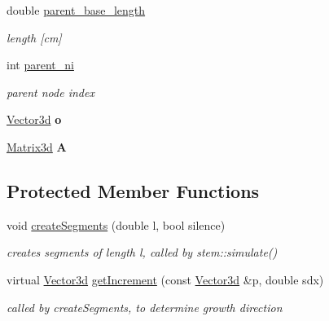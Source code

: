 \begin{DoxyCompactItemize}
\mbox{\label{classCPlantBox_1_1Leaf_a29ab9f0f1d359979004b9c3157061971}} 
double \hyperlink{classCPlantBox_1_1Leaf_a29ab9f0f1d359979004b9c3157061971}{parent\+\_\+base\+\_\+length}
\begin{DoxyCompactList}\small\item\em length \mbox{[}cm\mbox{]} \end{DoxyCompactList}\item 
\mbox{\label{classCPlantBox_1_1Leaf_af8f3ec361de47481109ce9df93cda3ec}} 
int \hyperlink{classCPlantBox_1_1Leaf_af8f3ec361de47481109ce9df93cda3ec}{parent\+\_\+ni}
\begin{DoxyCompactList}\small\item\em parent node index \end{DoxyCompactList}\item 
\mbox{\label{classCPlantBox_1_1Leaf_abc6c84cb5ba202076261bcf1a308c7aa}} 
\hyperlink{classCPlantBox_1_1Vector3d}{Vector3d} {\bfseries o}
\item 
\mbox{\label{classCPlantBox_1_1Leaf_a98beba3528f76279c56152b171146a9b}} 
\hyperlink{classCPlantBox_1_1Matrix3d}{Matrix3d} {\bfseries A}
\end{DoxyCompactItemize}
\subsection*{Protected Member Functions}
\begin{DoxyCompactItemize}
\item 
void \hyperlink{classCPlantBox_1_1Leaf_ab41a29c6e050d8dd31690679e095b80e}{create\+Segments} (double l, bool silence)
\begin{DoxyCompactList}\small\item\em creates segments of length l, called by stem\+::simulate() \end{DoxyCompactList}\item 
\mbox{\label{classCPlantBox_1_1Leaf_a8e9e823878a501b3703982b7679ef860}} 
virtual \hyperlink{classCPlantBox_1_1Vector3d}{Vector3d} \hyperlink{classCPlantBox_1_1Leaf_a8e9e823878a501b3703982b7679ef860}{get\+Increment} (const \hyperlink{classCPlantBox_1_1Vector3d}{Vector3d} \&p, double sdx)
\begin{DoxyCompactList}\small\item\em called by create\+Segments, to determine growth direction \end{DoxyCompactList}\end{DoxyCompactItemize}

